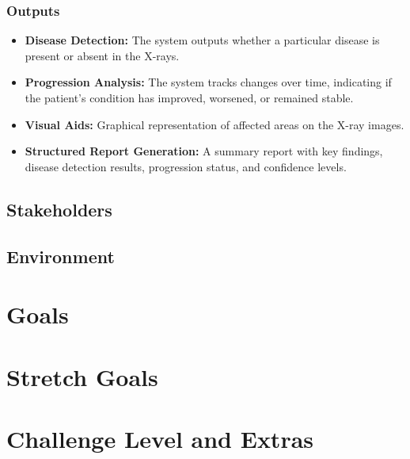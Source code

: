 \documentclass{article}
\begin{document}
\subsubsection{Outputs}

\begin{itemize}
    \item \textbf{Disease Detection:} The system outputs whether a particular disease is present or absent in the X-rays.
    \item \textbf{Progression Analysis:} The system tracks changes over time, indicating if the patient’s condition has improved, worsened, or remained stable.
    \item \textbf{Visual Aids:} Graphical representation of affected areas on the X-ray images.
    \item \textbf{Structured Report Generation:} A summary report with key findings, disease detection results, progression status, and confidence levels.

\end{itemize}



\subsection{Stakeholders}

\subsection{Environment}


\section{Goals}

\section{Stretch Goals}

\section{Challenge Level and Extras}

\end{document}
